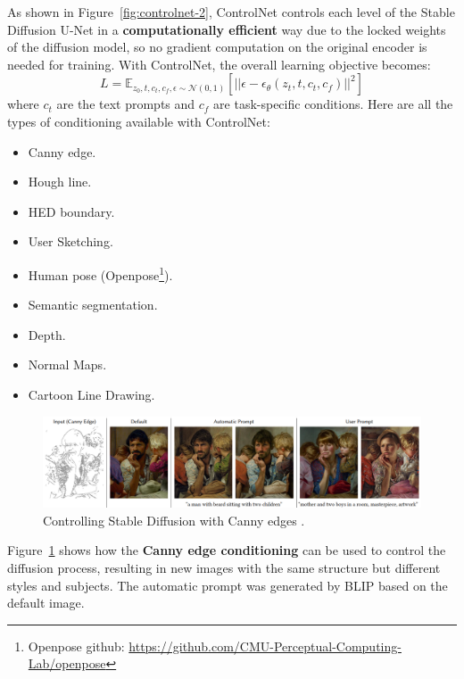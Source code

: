 \documentclass[preprint]{elsarticle}
\begin{document}
As shown in Figure~\ref{fig:controlnet-2}, ControlNet controls each level of the Stable Diffusion U-Net in a 
\textbf{computationally efficient} way due to the locked weights of the diffusion model, so no gradient computation on the original 
encoder is needed for training. With ControlNet, the overall learning objective becomes:
\begin{equation}
	L = \mathbb{E}_{z_0,t,c_t,c_f,\epsilon \sim \mathcal{N}(0,1)}\left[||\epsilon-\epsilon_\theta(z_t,t,c_t,c_f)||^2 \right]
\end{equation}
where $c_t$ are the text prompts and $c_f$ are task-specific conditions.
Here are all the types of conditioning available with ControlNet:
\begin{itemize}
	\item Canny edge.
	\item Hough line.
	\item HED boundary.
	\item User Sketching.
	\item Human pose (Openpose\footnote{Openpose github: \url{https://github.com/CMU-Perceptual-Computing-Lab/openpose}}).
	\item Semantic segmentation.
	\item Depth.
	\item Normal Maps.
	\item Cartoon Line Drawing.
\end{itemize}

\begin{figure}[H]
	\centering
	\includegraphics[width=15cm, keepaspectratio]{img/background_img/canny.png}
	\caption{Controlling Stable Diffusion with Canny edges \cite{zhang2023adding}.}
	\label{fig:canny}
\end{figure}

Figure~\ref{fig:canny} shows how the \textbf{Canny edge conditioning} can be used to control the diffusion process,
resulting in new images with the same structure but different styles and subjects.
The automatic prompt was generated by BLIP based on the default image.
\end{document}
